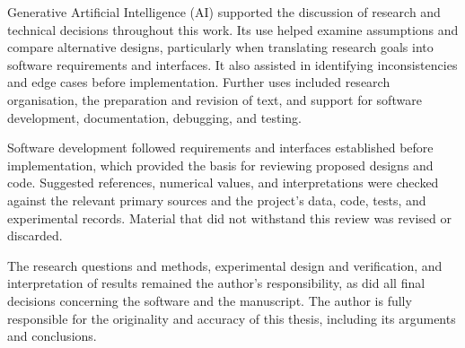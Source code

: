 
Generative Artificial Intelligence (AI) supported the discussion of research and technical decisions throughout this work. Its use helped examine assumptions and compare alternative designs, particularly when translating research goals into software requirements and interfaces. It also assisted in identifying inconsistencies and edge cases before implementation. Further uses included research organisation, the preparation and revision of text, and support for software development, documentation, debugging, and testing.

Software development followed requirements and interfaces established before implementation, which provided the basis for reviewing proposed designs and code. Suggested references, numerical values, and interpretations were checked against the relevant primary sources and the project's data, code, tests, and experimental records. Material that did not withstand this review was revised or discarded.

The research questions and methods, experimental design and verification, and interpretation of results remained the author's responsibility, as did all final decisions concerning the software and the manuscript. The author is fully responsible for the originality and accuracy of this thesis, including its arguments and conclusions.
